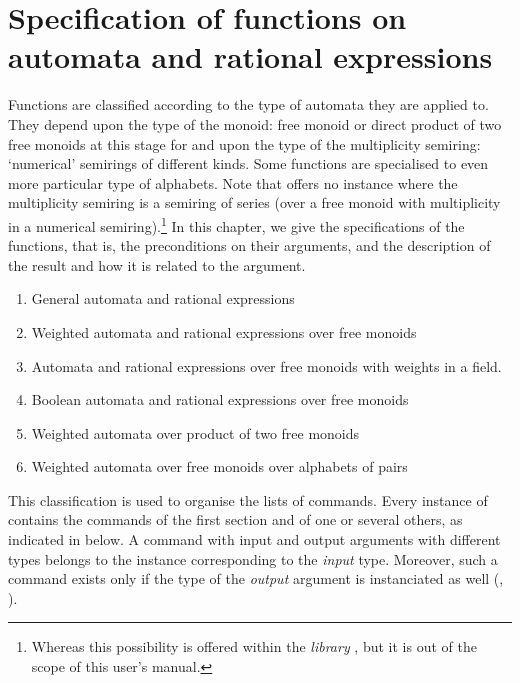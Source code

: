 
\chapter{Specification of functions on automata and rational 
expressions}
\label{chp:spe-fun}%

Functions are classified according to the type of automata they are 
applied to. 
They depend upon the type of the monoid: free monoid or direct 
product of two free monoids at this stage for \tafkitv and 
upon the type of the multiplicity semiring: `numerical' semirings
of different kinds.
Some functions are specialised to even more particular type of 
alphabets.
Note that \tafkitv  offers no instance where the multiplicity 
semiring is a semiring of series (over 
a free monoid with multiplicity in a numerical semiring).\footnote{%
   Whereas this possibility is offered within the \emph{library} 
   \vcsnv, but it is out of the scope of this user's manual.}
In this chapter, we give the specifications of the functions, that 
is, the preconditions on their arguments, and the description of the 
result and how it is related to the argument.

\begin{enumerate}
\item General automata and rational expressions 
\item Weighted  automata and rational expressions over free monoids
\item Automata and rational expressions over free monoids with 
weights in a field.
\item Boolean automata and rational expressions over free monoids
\item Weighted automata over product of two free monoids
\item Weighted automata over free monoids over alphabets of pairs
\end{enumerate}

This classification is used to organise the lists of commands.
Every instance of \tafkit contains the commands of the first section 
and of one or several others, as indicated in  
below.
A command with input and output arguments with different types 
belongs to the instance corresponding to the \emph{input} type.
Moreover, such a command exists only if the type of the \emph{output} 
argument is instanciated as well (\cf {},  
).

